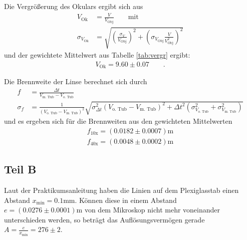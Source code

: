 \documentclass[12pt,a4paper,titlepage,headinclude,bibtotoc]{scrartcl}
\begin{document}
Die Vergrößerung des Okulars ergibt sich aus
\begin{align}
V_\text{Ok}&=\frac{V}{V_\text{Obj}}\qquad \text{mit}\\
\sigma_{V_\text{Ok}}&=\sqrt{\left(\frac{\sigma_V}{V_\text{Obj}}\right)^2+\left(\sigma_{V_\text{Obj}} \frac{V}{V_\text{Obj}^2} \right)^2}
\end{align}
und der gewichtete Mittelwert aus Tabelle \ref{tab:vergr} ergibt:
\begin{align}
V_\text{Ok}=9.60\pm0.07\qquad .
\end{align}

%
%
%
%

Die Brennweite der Linse berechnet sich durch
\begin{align}
f&=\frac{\Delta t}{V_\text{m. Tub} - V_\text{o. Tub}}\\
\sigma_f&=\frac{1}{\left(V_\text{o. Tub} - V_\text{m. Tub}\right)^{2}} \sqrt{\sigma_{\Delta t}^{2} \left(V_\text{o. Tub} - V_\text{m. Tub}\right)^{2} + \Delta t^{2} \left(\sigma_{V_\text{o. Tub}}^{2} + \sigma_{V_\text{m. Tub}}^{2}\right)}
\end{align}
und es ergeben sich für die Brennweiten aus den gewichteten Mittelwerten
\begin{align}
f_\text{10x}=(0.0182 \pm 0.0007)\si\metre\\
f_\text{40x}=(0.0048 \pm 0.0002)\si\metre
\end{align}

\subsection{Teil B}
Laut der Praktikumsanleitung haben die Linien auf dem Plexiglasstab einen Abstand $x_\text{min}=0.1\si{\milli\metre}$.
Können diese in einem Abstand $e=(0.0276\pm0.0001)\si{\metre}$ von dem Mikroskop nicht mehr voneinander unterschieden werden, so beträgt das Auflösungsvermögen gerade $A=\frac{e}{x_\text{min}}=276\pm2$.
\end{document}
